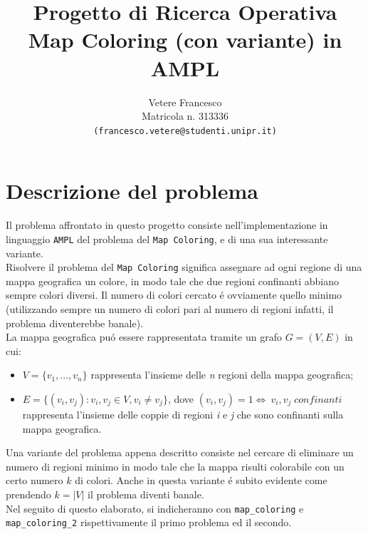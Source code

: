 \documentclass{article}
\title{\textbf{Progetto di Ricerca Operativa} \\
	\large \textbf{Map Coloring (con variante) in AMPL} \\
}
\author{Vetere Francesco\\ Matricola n. 313336 \\ \texttt{(francesco.vetere@studenti.unipr.it)}}
\date{}
\begin{document}
\maketitle
\tableofcontents

\pagebreak

\section{Descrizione del problema} 

Il problema affrontato in questo progetto consiste nell'implementazione in linguaggio \texttt{AMPL} del problema del \texttt{Map Coloring}, e di una sua interessante variante.\\
Risolvere il problema del \texttt{Map Coloring} significa assegnare ad ogni regione di una mappa geografica un colore, in modo tale che due regioni confinanti abbiano sempre colori diversi. Il numero di colori cercato \'e ovviamente quello minimo (utilizzando sempre un numero di colori pari al numero di regioni infatti, il problema diventerebbe banale).\\
La mappa geografica pu\'o essere rappresentata tramite un grafo $G = (V, E)$ in cui:
\begin{itemize}
\item $V=\{v_{1},...,v_{n}\}$ rappresenta l'insieme delle \emph{n} regioni della mappa geografica;
\item $E=\{(v_{i}, v_{j}) : v_{i}, v_{j} \in V, v_{i} \neq v_{j}\}$, dove $ (v_{i}, v_{j}) = 1 \iff \: v_{i}, v_{j} \; confinanti$ rappresenta l'insieme delle coppie di regioni \emph{i} e \emph{j} che sono confinanti sulla mappa geografica.
\end{itemize}

Una variante del problema appena descritto consiste nel cercare di eliminare un numero di regioni minimo in modo tale che la mappa risulti colorabile con un certo numero $k$ di colori. Anche in questa variante \'e subito evidente come prendendo $k = |V|$ il problema diventi banale.\\

Nel seguito di questo elaborato, si indicheranno con \texttt{map\_coloring} e \texttt{map\_coloring\_2} rispettivamente il primo problema ed il secondo.
\pagebreak
\end{document}

